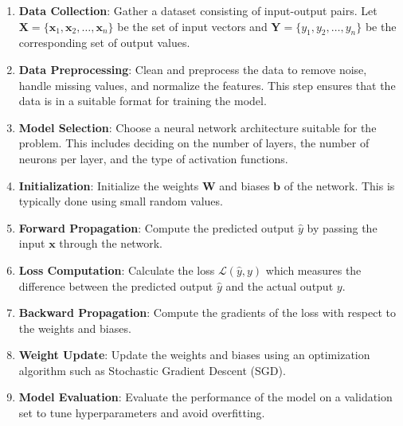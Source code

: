 \documentclass{report}
\begin{document}
        \begin{enumerate}
            \item \textbf{Data Collection}: Gather a dataset consisting of input-output pairs. Let \( \mathbf{X} = \{ \mathbf{x}_1, \mathbf{x}_2, \ldots, \mathbf{x}_n \} \) be the set of input vectors and \( \mathbf{Y} = \{ y_1, y_2, \ldots, y_n \} \) be the corresponding set of output values.
            
            \item \textbf{Data Preprocessing}: Clean and preprocess the data to remove noise, handle missing values, and normalize the features. This step ensures that the data is in a suitable format for training the model.
            
            \item \textbf{Model Selection}: Choose a neural network architecture suitable for the problem. This includes deciding on the number of layers, the number of neurons per layer, and the type of activation functions.
            
            \item \textbf{Initialization}: Initialize the weights \( \mathbf{W} \) and biases \( \mathbf{b} \) of the network. This is typically done using small random values.
            
            \item \textbf{Forward Propagation}: Compute the predicted output \( \hat{y} \) by passing the input \( \mathbf{x} \) through the network.
            
            \item \textbf{Loss Computation}: Calculate the loss \( \mathcal{L}(\hat{y}, y) \) which measures the difference between the predicted output \( \hat{y} \) and the actual output \( y \).
            
            \item \textbf{Backward Propagation}: Compute the gradients of the loss with respect to the weights and biases.
            
            \item \textbf{Weight Update}: Update the weights and biases using an optimization algorithm such as Stochastic Gradient Descent (SGD).
            
            \item \textbf{Model Evaluation}: Evaluate the performance of the model on a validation set to tune hyperparameters and avoid overfitting.
        \end{enumerate}
\end{document}
